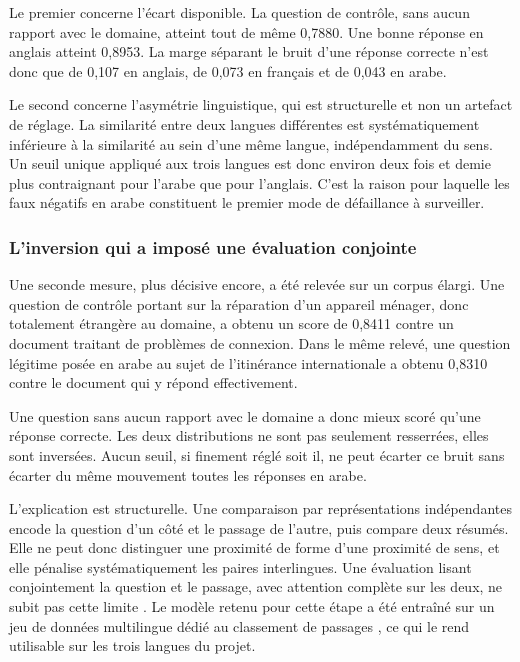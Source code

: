 Le premier concerne l'écart disponible. La question de contrôle, sans aucun rapport avec le domaine, atteint tout de même 0,7880. Une bonne réponse en anglais atteint 0,8953. La marge séparant le bruit d'une réponse correcte n'est donc que de 0,107 en anglais, de 0,073 en français et de 0,043 en arabe.

Le second concerne l'asymétrie linguistique, qui est structurelle et non un artefact de réglage. La similarité entre deux langues différentes est systématiquement inférieure à la similarité au sein d'une même langue, indépendamment du sens. Un seuil unique appliqué aux trois langues est donc environ deux fois et demie plus contraignant pour l'arabe que pour l'anglais. C'est la raison pour laquelle les faux négatifs en arabe constituent le premier mode de défaillance à surveiller.

\subsubsection{L'inversion qui a imposé une évaluation conjointe}

Une seconde mesure, plus décisive encore, a été relevée sur un corpus élargi. Une question de contrôle portant sur la réparation d'un appareil ménager, donc totalement étrangère au domaine, a obtenu un score de 0,8411 contre un document traitant de problèmes de connexion. Dans le même relevé, une question légitime posée en arabe au sujet de l'itinérance internationale a obtenu 0,8310 contre le document qui y répond effectivement.

Une question sans aucun rapport avec le domaine a donc mieux scoré qu'une réponse correcte. Les deux distributions ne sont pas seulement resserrées, elles sont inversées. Aucun seuil, si finement réglé soit il, ne peut écarter ce bruit sans écarter du même mouvement toutes les réponses en arabe.

L'explication est structurelle. Une comparaison par représentations indépendantes encode la question d'un côté et le passage de l'autre, puis compare deux résumés. Elle ne peut donc distinguer une proximité de forme d'une proximité de sens, et elle pénalise systématiquement les paires interlingues. Une évaluation lisant conjointement la question et le passage, avec attention complète sur les deux, ne subit pas cette limite \cite{nogueira}. Le modèle retenu pour cette étape a été entraîné sur un jeu de données multilingue dédié au classement de passages \cite{mmarco}, ce qui le rend utilisable sur les trois langues du projet.

